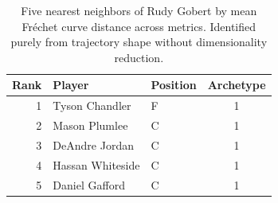 \begin{table}[htbp]
  \centering\small
  \begin{tabular}{rllc}
    \toprule
    Rank & Player & Position & Archetype \\
    \midrule
    1 & Tyson Chandler & F & 1 \\
    2 & Mason Plumlee & C & 1 \\
    3 & DeAndre Jordan & C & 1 \\
    4 & Hassan Whiteside & C & 1 \\
    5 & Daniel Gafford & C & 1 \\
    \bottomrule
  \end{tabular}
  \caption{Five nearest neighbors of Rudy Gobert by mean Fr\'{e}chet curve distance across metrics. Identified purely from trajectory shape without dimensionality reduction.}
  \label{tab:Rudy_Gobert_frechet_curve_neighbors}
\end{table}

